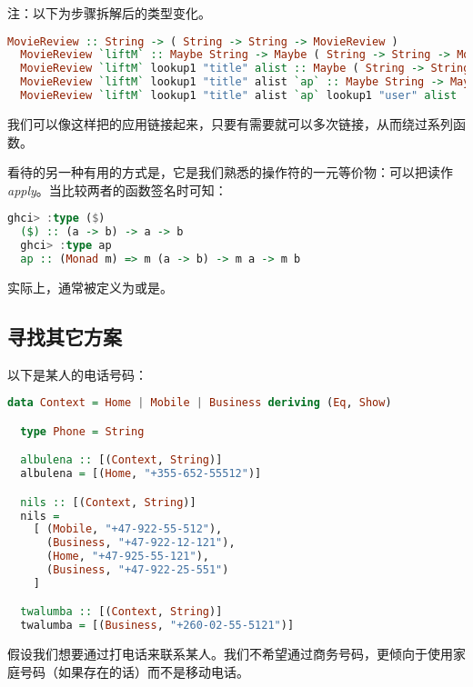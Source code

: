 \documentclass[./main.tex]{subfiles}
\begin{document}
注：以下为步骤拆解后的类型变化。

\begin{lstlisting}[language=Haskell]
  MovieReview :: String -> ( String -> String -> MovieReview )
  MovieReview `liftM` :: Maybe String -> Maybe ( String -> String -> MovieReview )
  MovieReview `liftM` lookup1 "title" alist :: Maybe ( String -> String -> MovieReview )
  MovieReview `liftM` lookup1 "title" alist `ap` :: Maybe String -> Maybe ( String -> MovieReview )
  MovieReview `liftM` lookup1 "title" alist `ap` lookup1 "user" alist :: Maybe ( String -> MovieReview )
\end{lstlisting}

我们可以像这样把的应用链接起来，只要有需要就可以多次链接，从而绕过系列函数。

看待的另一种有用的方式是，它是我们熟悉的\acode{(\$)}操作符的一元等价物：可以把读作\textit{apply}。当比较两者的函数签名时可知：

\begin{lstlisting}[language=Haskell]
  ghci> :type ($)
  ($) :: (a -> b) -> a -> b
  ghci> :type ap
  ap :: (Monad m) => m (a -> b) -> m a -> m b
\end{lstlisting}

实际上，通常被定义为或是。

\subsection*{寻找其它方案}

以下是某人的电话号码：

\begin{lstlisting}[language=Haskell]
  data Context = Home | Mobile | Business deriving (Eq, Show)

  type Phone = String

  albulena :: [(Context, String)]
  albulena = [(Home, "+355-652-55512")]

  nils :: [(Context, String)]
  nils =
    [ (Mobile, "+47-922-55-512"),
      (Business, "+47-922-12-121"),
      (Home, "+47-925-55-121"),
      (Business, "+47-922-25-551")
    ]

  twalumba :: [(Context, String)]
  twalumba = [(Business, "+260-02-55-5121")]
\end{lstlisting}

假设我们想要通过打电话来联系某人。我们不希望通过商务号码，更倾向于使用家庭号码（如果存在的话）而不是移动电话。
\end{document}
